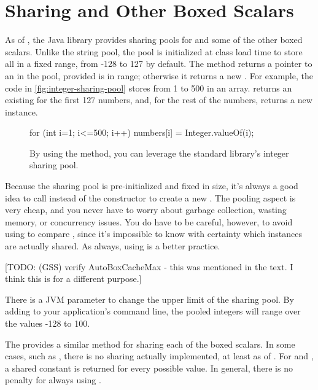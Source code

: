 \section{Sharing  and Other Boxed Scalars}

As of \javafive, the Java library provides sharing pools for 
and some of the other boxed scalars. Unlike the string pool, the 
pool is initialized at class load time to store all  in a fixed range, from -128 to 127 by
default. The method  returns a
pointer to an  in the pool, provided  is in
range; otherwise it returns a new . For example,
the code in \autoref{fig:integer-sharing-pool} stores  from 1 to
500 in an array.
 returns an existing 
for the first 127 numbers, and, for the rest of the numbers, 
returns a new  instance.

\begin{figure}
\centering
\begin{framedlisting}
for (int i=1; i<=500; i++) {
 numbers[i] = Integer.valueOf(i);
}
\end{framedlisting}
\caption{By using the  method, you can leverage the standard
library's integer sharing pool.}
\label{fig:integer-sharing-pool}
\end{figure}

Because the  sharing pool is pre-initialized and fixed in size,
it's always a good idea to call  instead of the
constructor to create a new . The pooling aspect is very cheap, and you never have to
worry about garbage collection, wasting memory, or concurrency issues.
You do have to be careful, however, to avoid using \code{==} to compare
, since it's impossible to know with certainty which instances
are actually shared.  As always, using  is a better practice.

[TODO: (GSS) verify AutoBoxCacheMax - this was mentioned in the text. I
think this is for a different purpose.]

There is a JVM parameter to change the upper limit of the 
sharing pool. By adding  to your
application's command line, the pooled integers will range over the values -128
to 100.

The \jre provides a similar  method for sharing each of the boxed
scalars. In some cases, such as , there is no sharing actually implemented, at
least as of \javasix. For  and , a
shared constant is returned for every possible value. In
general, there is no penalty for always using .



